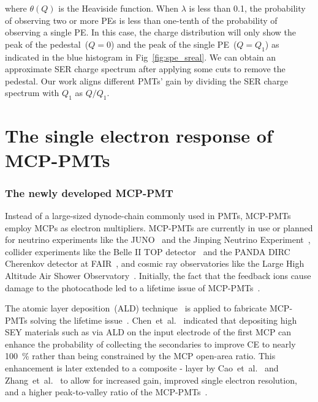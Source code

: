 where $\theta(Q)$ is the Heaviside function.
When $\lambda$ is less than 0.1,
the probability of observing two or more PEs is less than one-tenth of the probability of observing a single PE.
In this case, the charge distribution will only show the peak of the pedestal~($Q=0$) and the peak of the single PE~($Q=Q_1$) as indicated in the blue histogram in Fig~\ref{fig:spe_sreal}.
We can obtain an approximate SER charge spectrum after applying some cuts to remove the pedestal.
Our work aligns different PMTs' gain by dividing the SER charge spectrum with $Q_1$ as $Q/Q_1$.

\section{The single electron response of MCP-PMTs}
\subsubsection{The newly developed MCP-PMT}
Instead of a large-sized dynode-chain commonly used in PMTs,
MCP-PMTs employ MCPs as electron multipliers.
MCP-PMTs are currently in use or planned for neutrino experiments
like the JUNO~\cite{ZHU2020162002} and the Jinping Neutrino Experiment~\cite{Zhang:2023ued},
collider experiments like the Belle II TOP detector~\cite{MATSUOKA2014148} and the PANDA DIRC Cherenkov detector at FAIR~\cite{KRAUSS2023168659},
and cosmic ray observatories like the Large High Altitude Air Shower Observatory~\cite{Cao2019UpgradingPT}.
Initially, the fact that the feedback ions cause damage to the photocathode
led to a lifetime issue of MCP-PMTs~\cite{N2006Lifetime}.

The atomic layer deposition~(ALD) technique~\cite{2012An}
is applied to fabricate MCP-PMTs solving the lifetime issue~\cite{Lehmann:2022ret}.
Chen~et~al.~\cite{2016Optimization} indicated that depositing high SEY materials
such as  via ALD on the input electrode of the first MCP
can enhance the probability of collecting the secondaries to improve CE
to nearly \SI{100}{\%} rather than being constrained by the MCP open-area ratio.
This enhancement is later extended to a composite - layer
by Cao~et~al.~\cite{cao_secondary_2021} and Zhang~et~al.~\cite{zzj2021Al}
to allow for increased gain, improved single electron resolution,
and a higher peak-to-valley ratio of the MCP-PMTs~\cite{2021Effects}.


